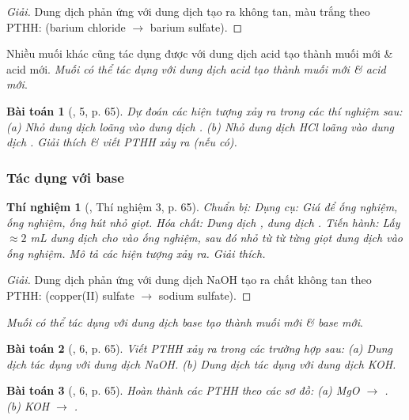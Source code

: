 \documentclass{article}
\newtheorem{baitoan}{Bài toán}
\newtheorem{thinghiem}{Thí nghiệm}
\begin{document}
\begin{proof}[Giải]
	Dung dịch  phản ứng với dung dịch  tạo ra  không tan, màu trắng theo PTHH:  (barium chloride $\to$ barium sulfate).
\end{proof}
Nhiều muối khác cũng tác dụng được với dung dịch acid tạo thành muối mới \& acid mới. \textit{Muối có thể tác dụng với dung dịch acid tạo thành muối mới \& acid mới}.

\begin{baitoan}[\cite{SGK_KHTN_8_Canh_Dieu}, 5, p. 65]
	Dự đoán các hiện tượng xảy ra trong các thí nghiệm sau: (a) Nhỏ dung dịch \emph{} loãng vào dung dịch \emph{}. (b) Nhỏ dung dịch \emph{HCl} loãng vào dung dịch \emph{}. Giải thích \& viết PTHH xảy ra (nếu có).
\end{baitoan}

\subsubsection{Tác dụng với base}

\begin{thinghiem}[\cite{SGK_KHTN_8_Canh_Dieu}, Thí nghiệm 3, p. 65]
	\emph{Chuẩn bị:} Dụng cụ: Giá để ống nghiệm, ống nghiệm, ống hút nhỏ giọt. Hóa chất: Dung dịch \emph{}, dung dịch \emph{}. \emph{Tiến hành:} Lấy $\approx2$ \emph{mL} dung dịch \emph{} cho vào ống nghiệm, sau đó nhỏ từ từ từng giọt dung dịch \emph{} vào ống nghiệm. Mô tả các hiện tượng xảy ra. Giải thích.
\end{thinghiem}

\begin{proof}[Giải]
	Dung dịch  phản ứng với dung dịch NaOH tạo ra chất không tan  theo PTHH:  (copper(II) sulfate $\to$ sodium sulfate).
\end{proof}
\textit{Muối có thể tác dụng với dung dịch base tạo thành muối mới \& base mới}.

\begin{baitoan}[\cite{SGK_KHTN_8_Canh_Dieu}, 6, p. 65]
	Viết PTHH xảy ra trong các trường hợp sau: (a) Dung dịch \emph{} tác dụng với dung dịch \emph{NaOH}. (b) Dung dịch \emph{} tác dụng với dung dịch \emph{KOH}.
\end{baitoan}

\begin{baitoan}[\cite{SGK_KHTN_8_Canh_Dieu}, 6, p. 65]
	Hoàn thành các PTHH theo các sơ đồ: (a) \emph{MgO $\to$ }. (b) \emph{KOH $\to$ }.
\end{baitoan}
\end{document}
